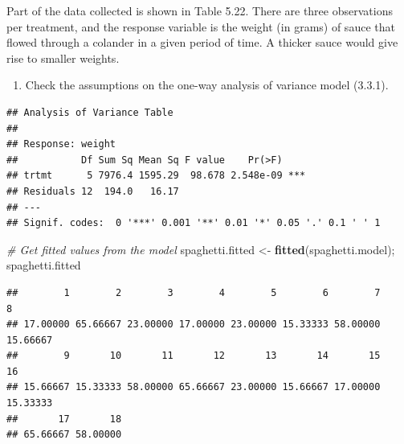 \documentclass[12pt,]{article}
\newenvironment{Shaded}{\begin{snugshade}}{\end{snugshade}}
\newcommand{\KeywordTok}[1]{\textcolor[rgb]{0.13,0.29,0.53}{\textbf{#1}}}
\newcommand{\DataTypeTok}[1]{\textcolor[rgb]{0.13,0.29,0.53}{#1}}
\newcommand{\StringTok}[1]{\textcolor[rgb]{0.31,0.60,0.02}{#1}}
\newcommand{\CommentTok}[1]{\textcolor[rgb]{0.56,0.35,0.01}{\textit{#1}}}
\newcommand{\OtherTok}[1]{\textcolor[rgb]{0.56,0.35,0.01}{#1}}
\newcommand{\OperatorTok}[1]{\textcolor[rgb]{0.81,0.36,0.00}{\textbf{#1}}}
\newcommand{\NormalTok}[1]{#1}
\providecommand{\tightlist}{%
  \setlength{\itemsep}{0pt}\setlength{\parskip}{0pt}}
\begin{document}
Part of the data collected is shown in Table 5.22. There are three
observations per treatment, and the response variable is the weight (in
grams) of sauce that flowed through a colander in a given period of
time. A thicker sauce would give rise to smaller weights.

\begin{enumerate}
\def\labelenumi{(\alph{enumi})}
\tightlist
\item
  Check the assumptions on the one-way analysis of variance model
  (3.3.1).
\end{enumerate}

\begin{Shaded}
\end{Shaded}

\begin{verbatim}
## Analysis of Variance Table
## 
## Response: weight
##           Df Sum Sq Mean Sq F value    Pr(>F)    
## trtmt      5 7976.4 1595.29  98.678 2.548e-09 ***
## Residuals 12  194.0   16.17                      
## ---
## Signif. codes:  0 '***' 0.001 '**' 0.01 '*' 0.05 '.' 0.1 ' ' 1
\end{verbatim}

\begin{Shaded}
\begin{Highlighting}[]
\CommentTok{# Get fitted values from the model}
\NormalTok{spaghetti.fitted <-}\StringTok{ }\KeywordTok{fitted}\NormalTok{(spaghetti.model); spaghetti.fitted}
\end{Highlighting}
\end{Shaded}

\begin{verbatim}
##        1        2        3        4        5        6        7        8 
## 17.00000 65.66667 23.00000 17.00000 23.00000 15.33333 58.00000 15.66667 
##        9       10       11       12       13       14       15       16 
## 15.66667 15.33333 58.00000 65.66667 23.00000 15.66667 17.00000 15.33333 
##       17       18 
## 65.66667 58.00000
\end{verbatim}
\end{document}
